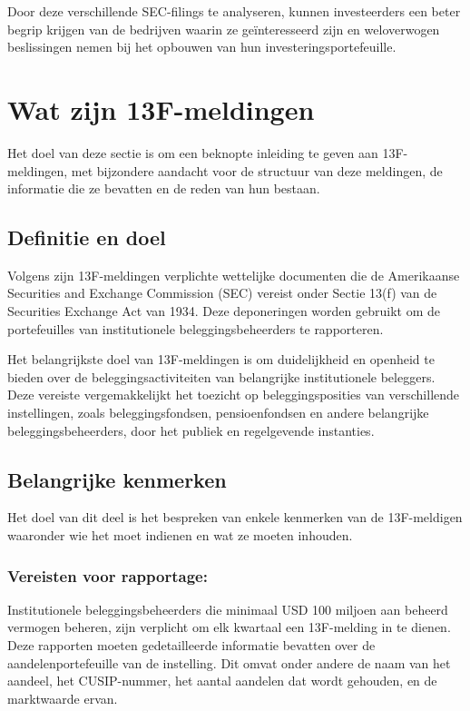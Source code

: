 Door deze verschillende SEC-filings te analyseren, kunnen investeerders een beter begrip krijgen van de bedrijven waarin ze geïnteresseerd zijn en weloverwogen beslissingen nemen bij het opbouwen van hun investeringsportefeuille.

\section{Wat zijn 13F-meldingen}

Het doel van deze sectie is om een beknopte inleiding te geven aan 13F-meldingen, met bijzondere aandacht voor de structuur van deze meldingen, de informatie die ze bevatten en de reden van hun bestaan.


\subsection{Definitie en doel}
Volgens \autocite{SECform13F2024} zijn 13F-meldingen verplichte wettelijke documenten die de Amerikaanse Securities and Exchange Commission (SEC) vereist onder Sectie 13(f) van de Securities Exchange Act van 1934. Deze deponeringen worden gebruikt om de portefeuilles van institutionele beleggingsbeheerders te rapporteren.

Het belangrijkste doel van 13F-meldingen is om duidelijkheid en openheid te bieden over de beleggingsactiviteiten van belangrijke institutionele beleggers. Deze vereiste vergemakkelijkt het toezicht op beleggingsposities van verschillende instellingen, zoals beleggingsfondsen, pensioenfondsen en andere belangrijke beleggingsbeheerders, door het publiek en regelgevende instanties.

\subsection{Belangrijke kenmerken}
Het doel van dit deel is het bespreken van enkele kenmerken van de 13F-meldigen waaronder wie het moet indienen en wat ze moeten inhouden.


\subsubsection{Vereisten voor rapportage:}

Institutionele beleggingsbeheerders die minimaal USD 100 miljoen aan beheerd vermogen beheren, zijn verplicht om elk kwartaal een 13F-melding in te dienen. Deze rapporten moeten gedetailleerde informatie bevatten over de aandelenportefeuille van de instelling. Dit omvat onder andere de naam van het aandeel, het CUSIP-nummer, het aantal aandelen dat wordt gehouden, en de marktwaarde ervan. 
